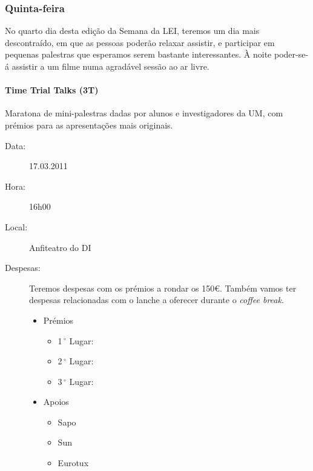 \subsubsection*{Quinta-feira}
No quarto dia desta edição da Semana da LEI, teremos um dia mais descontraído, em que as pessoas poderão relaxar assistir, e participar em pequenas palestras que esperamos serem bastante interessantes. À noite poder-se-á assistir a um filme numa agradável sessão ao ar livre.
%
\paragraph{Time Trial Talks (3T)}
Maratona de mini-palestras dadas por alunos e investigadores da UM, com prémios para as apresentações mais originais.
\begin{description}
\item[Data:] 17.03.2011
\item[Hora:] 16h00
\item[Local:] Anfiteatro do DI
\item[Despesas:] Teremos despesas com os prémios a rondar os 150\euro. Também vamos ter despesas relacionadas com o lanche a oferecer durante o \emph{coffee break}.
\begin{itemize}
\item Prémios
\begin{itemize}
\item 1$\,^{\circ}$ Lugar:
\item 2$\,^{\circ}$ Lugar:
\item 3$\,^{\circ}$ Lugar:
\end{itemize}
\item Apoios
\begin{itemize}
\item Sapo
\item Sun
\item Eurotux
\end{itemize}
\end{itemize}
\end{description}
%
